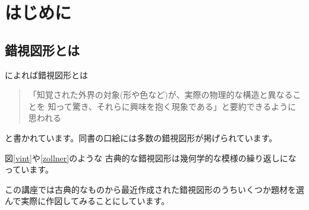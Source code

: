 \chapter*{はじめに}
\section*{錯視図形とは}
\cite[序 \romannumeral1ページ]{OIHandbook}によれば錯視図形とは
\begin{quotation}
 「知覚された外界の対象(形や色など)が、実際の物理的な構造と異なることを
 知って驚き、それらに興味を抱く現象である」と要約できるように思われる
\end{quotation}
と書かれています。同書の口絵には多数の錯視図形が掲げられています。

図\ref{vint}や\ref{zollner}のような
古典的な錯視図形は幾何学的な模様の繰り返しになっています。

\renewcommand{\thefigure}{\arabic{figure}}
\begin{center}
\end{center}
 \begin{center}
 \end{center}

この講座では古典的なものから最近作成された錯視図形のうちいくつか題材を選
んで実際に作図してみることにしています。

